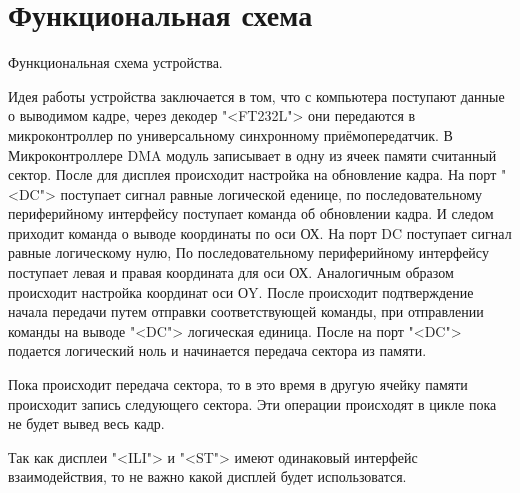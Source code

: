 \chapter{Функциональная схема}

	{Функциональная схема устройства.} %

	Идея работы устройства заключается в том, что с компьютера поступают данные о выводимом кадре, через декодер "<FT232L"> они передаются в микроконтроллер по универсальному синхронному приёмопередатчик. В Микроконтроллере DMA модуль записывает в одну из ячеек памяти считанный сектор. После для дисплея происходит настройка на обновление кадра. На порт "<DC"> поступает сигнал равные логической еденице, по последовательному периферийному интерфейсу поступает команда об обновлении кадра. И следом приходит команда о выводе координаты по оси ОХ. На порт DC поступает сигнал равные логическому нулю, По последовательному периферийному интерфейсу поступает левая и правая координата для оси ОХ. Аналогичным образом происходит настройка координат оси ОY. После происходит подтверждение начала передачи путем отправки соответствующей команды, при отправлении команды на выводе "<DC"> логическая единица. После на порт "<DC"> подается логический ноль и начинается передача сектора из памяти. 
	
	Пока происходит передача сектора, то в это время в другую ячейку памяти происходит запись следующего сектора. Эти операции происходят в цикле пока не будет вывед весь кадр.
	
	Так как дисплеи "<ILI"> и "<ST"> имеют одинаковый интерфейс взаимодействия, то не важно какой дисплей будет использоватся.


	
	
	

